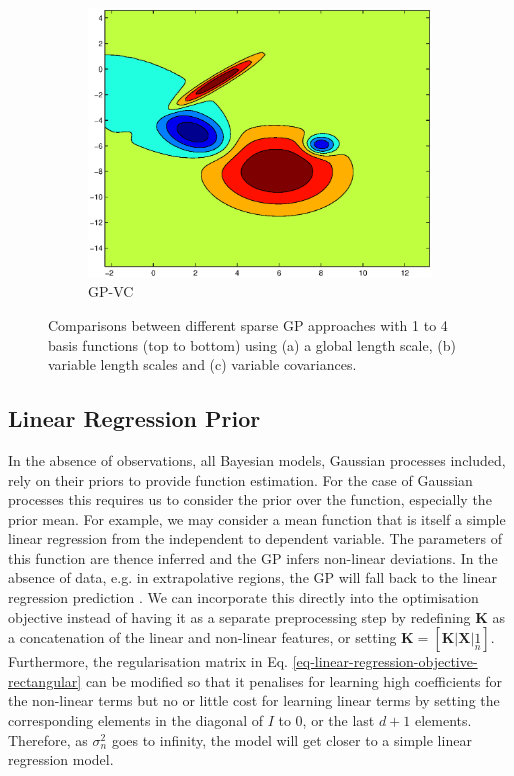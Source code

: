 \documentclass[useAMS,usenatbib,fleqn]{mn2e}
\newcommand{\bm}[1]{\mathbf{#1} }
\begin{document}
\begin{figure}
\begin{subfigure}[b]{0.3\columnwidth}
                \includegraphics[width=\textwidth]{figures/VC4.eps}
                \caption{GP-VC}
        \end{subfigure}
               
        \caption{Comparisons between different sparse GP approaches with 1 to 4 basis functions (top to bottom) using (a) a global length scale, (b) variable length scales and (c) variable covariances.}
        \label{fig-toy-comparison}
\end{figure}

\subsection{Linear Regression Prior}

In the absence of observations, all Bayesian models, Gaussian processes included, rely on their priors to provide function estimation. For the case of Gaussian processes this requires us to consider the prior over the function, especially the prior mean. For example, we may consider a mean function that is itself a simple linear regression from the independent to dependent variable. The parameters of this function are thence inferred and the GP infers non-linear deviations. In the absence of data, e.g. in extrapolative regions, the GP will fall back to the linear regression prediction \citep{roberts2012rs}. We can incorporate this directly into the optimisation objective instead of having it as a separate preprocessing step by redefining $\bm{K}$ as a concatenation of the linear and non-linear features, or setting $\bm{K}=[\bm{K}|\bm{X}|\underset{n}{1}]$. Furthermore, the regularisation matrix in Eq. \eqref{eq-linear-regression-objective-rectangular} can be modified so that it penalises for learning high coefficients for the non-linear terms but no or little cost for learning linear terms by setting the corresponding elements in the diagonal of $I$ to 0, or the last $d+1$ elements. Therefore, as $\sigma_{n}^{2}$ goes to infinity, the model will get closer to a simple linear regression model.
\end{document}
